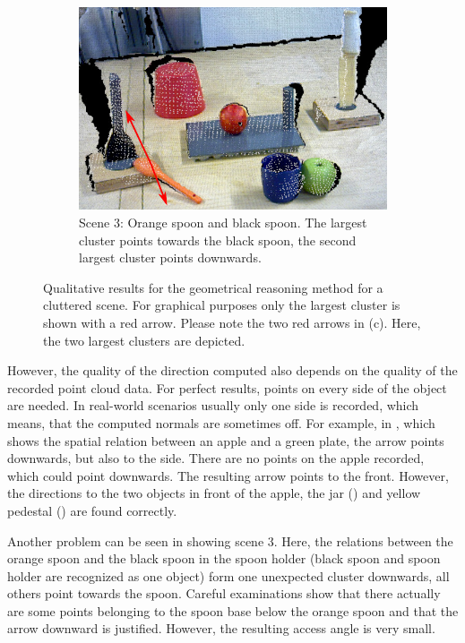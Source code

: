 \begin{figure}[]
\begin{subfigure}[t]{0.475\textwidth}
    \includegraphics[width=\textwidth]{./figures/sec/geometrical_reasoning/affordance_arrow_scene5_3.jpg}
    \caption{Scene 3: Orange spoon and black spoon. The largest cluster points towards the black spoon, the second largest cluster points downwards.}
    \label{fig:sec_enriched_geometricalreasoning_experiments_scene3_3}
  \end{subfigure}
  \caption{Qualitative results for the geometrical reasoning method for a cluttered scene. For graphical purposes only the largest cluster is shown with a red arrow. Please note the two red arrows in (c). Here, the two largest clusters are depicted.}
  \label{fig:sec_enriched_geometricalreasoning_experiments_scene3}
\end{figure}

However, the quality of the direction computed also depends on the quality of the recorded point cloud data.
For perfect results, points on every side of the object are needed.
In real-world scenarios usually only one side is recorded, which means, that the computed normals are sometimes off.
For example, in , which shows the spatial relation between an apple and a green plate, the arrow points downwards, but also to the side.
There are no points on the apple recorded, which could point downwards.
The resulting arrow points to the front.
However, the directions to the two objects in front of the apple, the jar () and yellow pedestal () are found correctly.

Another problem can be seen in  showing scene 3.
Here, the relations between the orange spoon and the black spoon in the spoon holder (black spoon and spoon holder are recognized as one object) form one unexpected cluster downwards, all others point towards the spoon.
Careful examinations show that there actually are some points belonging to the spoon base below the orange spoon and that the arrow downward is justified.
However, the resulting access angle is very small.

